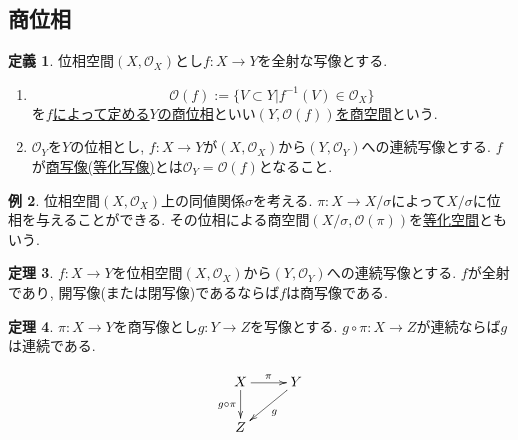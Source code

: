\documentclass[dvipdfmx,a4paper,11pt]{article}
\theoremstyle{definition}
\newtheorem{thm}{定理}
\newtheorem{dfn}[thm]{定義}
\newtheorem{exa}[thm]{例}
\begin{document}
 \subsection{商位相}
   \begin{tcolorbox}[
    colback = white,
    colframe = green!35!black,
    fonttitle = \bfseries,
    breakable = true]
    \begin{dfn}
位相空間$(X, \mathscr{O}_X )$とし$f : X \rightarrow Y$を全射な写像とする.

\begin{enumerate}
\item $$
\mathscr{O}(f) := \{ V \subset Y | f^{-1}(V) \in \mathscr{O}_X \}
$$
を\underline{$f$によって定める$Y$の商位相}といい\underline{$(Y,\mathscr{O}(f))$を商空間}という. 
\item $\mathscr{O}_Y$を$Y$の位相とし, $f : X \rightarrow Y$が$(X, \mathscr{O}_X )$から$(Y, \mathscr{O}_Y )$への連続写像とする. $f$が\underline{商写像(等化写像)}とは$\mathscr{O}_Y  = \mathscr{O}(f)$となること.
\end{enumerate}
  \end{dfn}
 \end{tcolorbox}
\begin{exa}
位相空間$(X, \mathscr{O}_X )$上の同値関係$\sigma$を考える. $\pi : X \rightarrow X/\sigma$によって$X/\sigma$に位相を与えることができる. その位相による商空間$(X/\sigma,\mathscr{O}(\pi))$を\underline{等化空間}ともいう.
\end{exa}
   \begin{tcolorbox}[
    colback = white,
    colframe = green!35!black,
    fonttitle = \bfseries,
    breakable = true]
    \begin{thm}
$f : X \rightarrow Y$を位相空間$(X, \mathscr{O}_X )$から$(Y, \mathscr{O}_Y )$への連続写像とする. 
$f$が全射であり, 開写像(または閉写像)であるならば$f$は商写像である.
  \end{thm}
 \end{tcolorbox}
 
    \begin{tcolorbox}[
    colback = white,
    colframe = green!35!black,
    fonttitle = \bfseries,
    breakable = true]
    \begin{thm}
$\pi : X \rightarrow Y$を商写像とし$g : Y\rightarrow Z$を写像とする.
$g \circ \pi : X \rightarrow Z$が連続ならば$g$は連続である.

 
  \begin{equation*}
\xymatrix@C=25pt@R=20pt{
X\ar@{->}[d]_{g \circ \pi}  \ar@{->}[r]^{\pi} & Y \ar@{->}[ld]^{g}  \\
Z & 
 }
\end{equation*}
  \end{thm}
 \end{tcolorbox}
\end{document}
